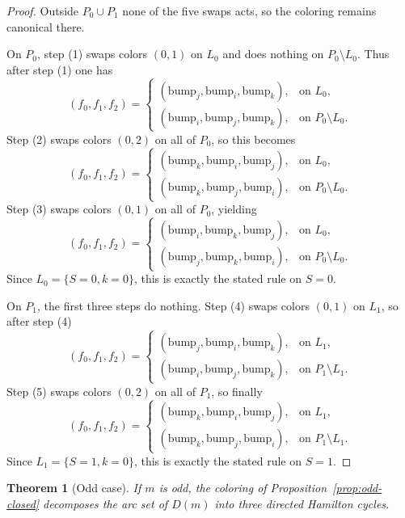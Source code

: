 \documentclass[11pt]{article}
\newtheorem{theorem}{Theorem}
\begin{document}
\begin{proof}
Outside $P_0\cup P_1$ none of the five swaps acts, so the coloring remains canonical there.

On $P_0$, step (1) swaps colors $(0,1)$ on $L_0$ and does nothing on $P_0\setminus L_0$.
Thus after step (1) one has
\[
(f_0,f_1,f_2)=
\begin{cases}
(\mathrm{bump}_j,\mathrm{bump}_i,\mathrm{bump}_k), & \text{on }L_0,\\
(\mathrm{bump}_i,\mathrm{bump}_j,\mathrm{bump}_k), & \text{on }P_0\setminus L_0.
\end{cases}
\]
Step (2) swaps colors $(0,2)$ on all of $P_0$, so this becomes
\[
(f_0,f_1,f_2)=
\begin{cases}
(\mathrm{bump}_k,\mathrm{bump}_i,\mathrm{bump}_j), & \text{on }L_0,\\
(\mathrm{bump}_k,\mathrm{bump}_j,\mathrm{bump}_i), & \text{on }P_0\setminus L_0.
\end{cases}
\]
Step (3) swaps colors $(0,1)$ on all of $P_0$, yielding
\[
(f_0,f_1,f_2)=
\begin{cases}
(\mathrm{bump}_i,\mathrm{bump}_k,\mathrm{bump}_j), & \text{on }L_0,\\
(\mathrm{bump}_j,\mathrm{bump}_k,\mathrm{bump}_i), & \text{on }P_0\setminus L_0.
\end{cases}
\]
Since $L_0=\{S=0,k=0\}$, this is exactly the stated rule on $S=0$.

On $P_1$, the first three steps do nothing.
Step (4) swaps colors $(0,1)$ on $L_1$, so after step (4)
\[
(f_0,f_1,f_2)=
\begin{cases}
(\mathrm{bump}_j,\mathrm{bump}_i,\mathrm{bump}_k), & \text{on }L_1,\\
(\mathrm{bump}_i,\mathrm{bump}_j,\mathrm{bump}_k), & \text{on }P_1\setminus L_1.
\end{cases}
\]
Step (5) swaps colors $(0,2)$ on all of $P_1$, so finally
\[
(f_0,f_1,f_2)=
\begin{cases}
(\mathrm{bump}_k,\mathrm{bump}_i,\mathrm{bump}_j), & \text{on }L_1,\\
(\mathrm{bump}_k,\mathrm{bump}_j,\mathrm{bump}_i), & \text{on }P_1\setminus L_1.
\end{cases}
\]
Since $L_1=\{S=1,k=0\}$, this is exactly the stated rule on $S=1$.
\end{proof}

\begin{theorem}[Odd case]\label{thm:odd-hamilton}
If $m$ is odd, the coloring of Proposition~\ref{prop:odd-closed} decomposes the arc set of $D(m)$ into three directed Hamilton cycles.
\end{theorem}
\end{document}
